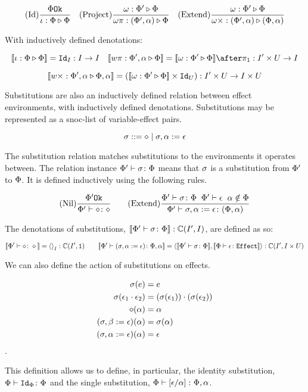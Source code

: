 \documentclass{Report}
\begin{document}
\[
    \treerule{Id}{\ok{\P}}{\wrel{\i}{\P}{\P}}
    \quad
    \treerule{Project}{\wrel{\w}{\P'}{\P}}{\wrel{\w\pi}{(\P', \a)}{\P}}
    \quad
    \treerule{Extend}{\wrel{\w}{\P'}{\P}}{\wrel{\w\x}{(\P', \a)}{(\P, \a)}}
\]

With inductively defined denotations: 

\[
    \deno{\wrel{\i}{\P}{\P}} = \Id{I}: I \rightarrow I
    \quad
    \deno{\wrel{w\pi}{\P',\a}{\P}} = \deno{\wrelw{\P'}{\P}}\after \p: I'\times U\rightarrow I
\]

\[
    \deno{\wrel{w\x}{\P',\a}{\P,\a}} = (\deno{\wrelw{\P'}{\P}}\times \Id{U}): I'\times U\rightarrow I\times U    
\]

Substitutions are also an inductively defined relation between effect environments, with inductively defined denotations. Substitutions may be represented as a snoc-list of variable-effect pairs.

\[
    \si \gens \nil \mid \si, \a \setto \e    
\]

The substitution relation matches substitutions to the environments it operates between. The relation instance $\typerelation{\P'}{\si}{\P}$ means that $\si$ is a substitution from $\P'$ to $\P$. It is defined inductively using the following rules.

\[
    \treerule{Nil}{\ok{\P'}}{\typerelation{\P'}{\nil}{\nil}}
    \quad\quad
    \treerule{Extend}{\typerelation{\P'}{\si}{\P}\s\s\wellformed{\P'}{\e}\s\s\a\notin\P}{\typerelation{\P'}{\si, \a \setto\e}{(\P, \a)}}
\]

The denotations of substitutions, $\deno{\typerelation{\P'}{\si}{\P}}: \cii$, are defined as so:

\[
    \deno{\typerelation{\P'}{\nil}{\nil}} = \term{I}: \C(I', \1)
    \quad\quad
    \deno{\typerelation{\P'}{(\si, \a\setto\e)}{\P,\a}} = \pr{\deno{\typerelation{\P'}{\si}{\P}}}{\deno{\typerelation{\P}{\e}{\effect}}}: \C(I', I\times U)
\]

We can also define the action of substitutions on effects.

\begin{align}
    \si(e) & = e \\
    \si(\e_1\dot\e_2) & = (\si(\e_1))\dot(\si(\e_2))\\
    \nil(\a) & = \a\\
    (\si, \b\setto \e)(\a) & = \si(\a) \\
    (\si, \a\setto \e)(\a) & =\e
\end{align}.

This definition allows us to define, in particular, the identity substitution,$\typerelation{\P}{\Id{\P}}{\P}$ and the single substitution, $\typerelation{\P}{\ssub{\a}{\e}}{\P,\a}$.
\end{document}
